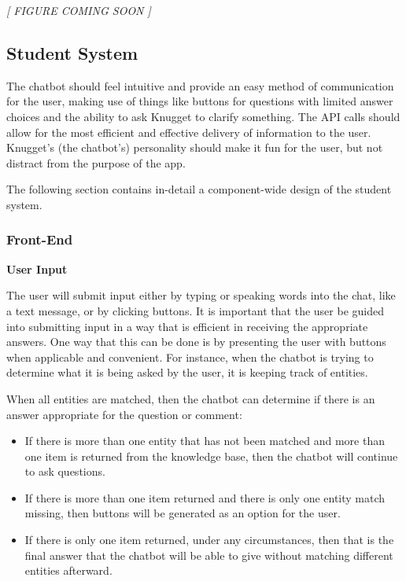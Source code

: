\documentclass[titlepage, 12pt]{article}
\begin{document}
\begin{center}\emph{[ FIGURE COMING SOON ]}\end{center}

\subsection{Student System}

The chatbot should feel intuitive and provide an easy method of communication for the user, making use of things like buttons for questions with limited answer choices and the ability to ask Knugget to clarify something. The API calls should allow for the most efficient and effective delivery of information to the user. Knugget’s (the chatbot’s) personality should make it fun for the user, but not distract from the purpose of the app.

The following section contains in-detail a component-wide design of the student system.

\subsubsection{Front-End}

\textbf{User Input}

The user will submit input either by typing or speaking words into the chat, like a text message, or by clicking buttons. It is important that the user be guided into submitting input in a way that is efficient in receiving the appropriate answers. One way that this can be done is by presenting the user with buttons when applicable and convenient. For instance, when the chatbot is trying to determine what it is being asked by the user, it is keeping track of entities.

When all entities are matched, then the chatbot can determine if there is an answer appropriate for the question or comment:

\begin{itemize}
    \item If there is more than one entity that has not been matched and more than one item is returned from the knowledge base, then the chatbot will continue to ask questions.
    \item If there is more than one item returned and there is only one entity match missing, then buttons will be generated as an option for the user.
    \item If there is only one item returned, under any circumstances, then that is the final answer that the chatbot will be able to give without matching different entities afterward.
\end{itemize}
\end{document}
